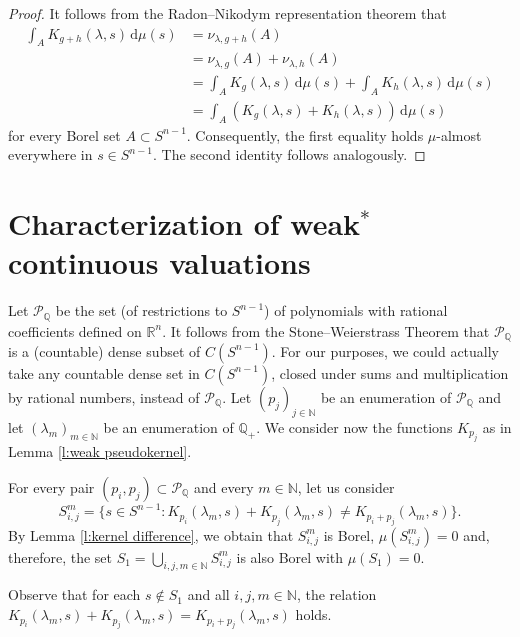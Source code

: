 \documentclass[11pt, a4paper]{amsart}
\renewcommand{\d}{\,\mathrm{d}}
\newcommand{\sn}{{S^{n-1}}}
\renewcommand{\d}{\,\mathrm{d}}
\newcommand{\rn}{\mathbb R^n}
\newcommand{\poly}{\mathcal P_{\mathbb Q}}
\begin{document}
\begin{proof}
It follows from the Radon--Nikodym representation theorem that
\begin{align*}
    \int_A K_{g+h}(\lambda, s) \d\mu(s) &= \nu_{\lambda,g+h}(A) \\
    &=\nu_{\lambda,g}(A)+\nu_{\lambda,h}(A)\\ 
    &= \int_A K_g(\lambda, s) \d\mu(s) + \int_A K_h(\lambda, s) \d\mu(s) \\
    &= \int_A ( K_g(\lambda, s)+ K_h(\lambda, s)) \d\mu(s)
\end{align*}
for every Borel set $A\subset\sn$. Consequently, the first equality holds $\mu$-almost everywhere in $s\in\sn$. The second identity follows analogously.
\end{proof}






\section{Characterization of weak$^*$ continuous valuations}\label{S:Usection} 

Let $\poly$ be the set (of restrictions to $\sn$) of polynomials with rational coefficients defined on $\rn$. It follows from the Stone--Weierstrass Theorem that $\poly$ is a (countable) dense subset of $C(\sn )$. For our purposes, we could actually take any countable dense set in $C(\sn )$, closed under sums and multiplication by rational numbers, instead of $\poly$.   
Let $\left( p_j\right)_{j\in \mathbb N}$ be an enumeration of $\poly$ and let $(\lambda_m)_{m\in\mathbb{N}}$ be an enumeration of $\mathbb{Q}_{\scriptscriptstyle +}$. We consider now the functions $K_{p_j}$ as in Lemma \ref{l:weak pseudokernel}.

For every pair $(p_i,p_j)\subset \poly$ and every $m\in \mathbb N$, let us consider 
\[
  S^{m}_{i,j}= \{s\in\sn:K_{p_i}(\lambda_m,s)+K_{p_j}(\lambda_m,s)\neq K_{p_i+p_j}(\lambda_m,s)\}.
\]
By Lemma \ref{l:kernel difference}, we obtain that $S^{m}_{i,j}$ is Borel, $\mu(S^m_{i,j})=0$ and, therefore, the set $S_1=\bigcup_{i,j,m\in\mathbb{N}}S^m_{i,j}$ is also Borel with $\mu(S_1)=0$. 

Observe that for each $s\notin S_1$ and all $i,j,m\in\mathbb{N}$, the relation $K_{p_i}(\lambda_m,s)+K_{p_j}(\lambda_m,s)=K_{p_i+p_j}(\lambda_m,s)$ holds.
\end{document}
